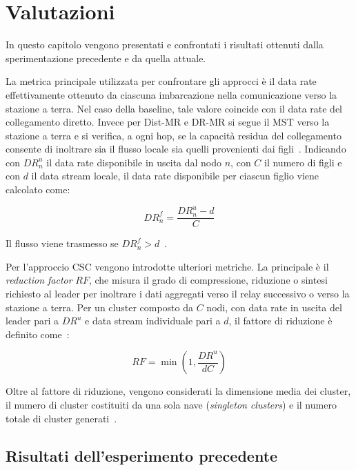\chapter{Valutazioni}
\label{chap:valutazioni}

In questo capitolo vengono presentati e confrontati i risultati ottenuti dalla sperimentazione precedente e da quella attuale.

La metrica principale utilizzata per confrontare gli approcci è il data rate effettivamente ottenuto da ciascuna imbarcazione nella comunicazione verso la stazione a terra. Nel caso della baseline, tale valore coincide con il data rate del collegamento diretto. Invece per \ac{Dist-MR} e \ac{DR-MR} si segue il \ac{MST} verso la stazione a terra e si verifica, a ogni hop, se la capacità residua del collegamento consente di inoltrare sia il flusso locale sia quelli provenienti dai figli~\cite{11217861}. Indicando con $DR^u_n$ il data rate disponibile in uscita dal nodo $n$, con $C$ il numero di figli e con $d$ il data stream locale, il data rate disponibile per ciascun figlio viene calcolato come:

\begin{equation}
DR^f_n = \frac{DR^u_n - d}{C}
\label{eq:forwarding_rate}
\end{equation}

Il flusso viene trasmesso se $DR^f_n > d$~\cite{11217861}.

Per l'approccio \ac{CSC} vengono introdotte ulteriori metriche. La principale è il \textit{reduction factor} $RF$, che misura il grado di compressione, riduzione o sintesi richiesto al leader per inoltrare i dati aggregati verso il relay successivo o verso la stazione a terra. Per un cluster composto da $C$ nodi, con data rate in uscita del leader pari a $DR^u$ e data stream individuale pari a $d$, il fattore di riduzione è definito come~\cite{11217861}:

\begin{equation}
RF = \min\left(1, \frac{DR^u}{dC}\right)
\label{eq:reduction_factor}
\end{equation}

Oltre al fattore di riduzione, vengono considerati la dimensione media dei cluster, il numero di cluster costituiti da una sola nave (\textit{singleton clusters}) e il numero totale di cluster generati~\cite{11217861}.

\section{Risultati dell’esperimento precedente}
\label{sec:risultati_precedenti}

